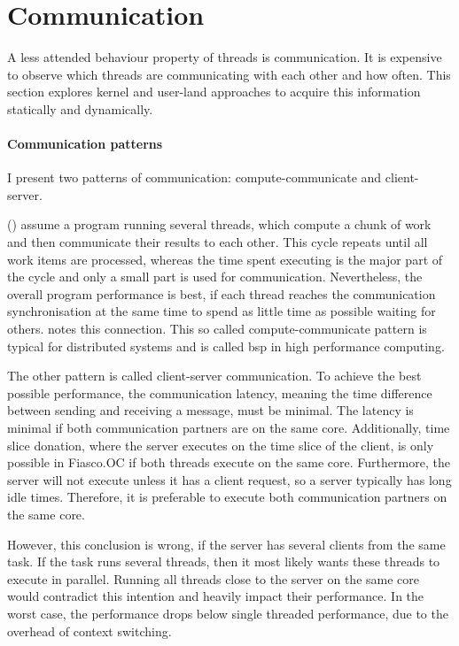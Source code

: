 \section{Communication}
\label{design:comm}


A less attended behaviour property of threads is communication.
It is expensive to observe which threads are communicating with each other and
how often.
This section explores kernel and user-land approaches to acquire this
information statically and dynamically.


\paragraph{Communication patterns}
I present two patterns of communication: compute-communicate and client-server.

\citeauthor{hofmeyr_load_2010} (\cite{hofmeyr_load_2010}) assume a program running several threads, which
compute a chunk of work and then communicate their results to each other.
This cycle repeats until all work items are processed, whereas the time spent executing
is the major part of the cycle and only a small part is used for communication.
Nevertheless, the overall program performance is best, if each thread reaches
the communication synchronisation at the same time to spend as little time as
possible waiting for others.
\cite{hofmeyr_load_2010} notes this connection.
This so called compute-communicate pattern is typical for distributed systems and is
called \gls{bsp} in high performance computing.

The other pattern is called client-server communication.
To achieve the best possible performance, the communication latency, meaning
the time difference between sending and receiving a message, must be minimal.
The latency is minimal if both communication partners are on the same core.
Additionally, time slice donation, where the server executes on the time slice
of the client, is only possible in Fiasco.OC if both threads execute on the same core.
Furthermore, the server will not execute unless it has a client request, so a
server typically has long idle times.
Therefore, it is preferable to execute both communication partners on the same
core.

However, this conclusion is wrong, if the server has several clients from the
same task.
If the task runs several threads, then it most likely wants these threads to
execute in parallel.
Running all threads close to the server on the same core would contradict this
intention and heavily impact their performance.
In the worst case, the performance drops below single threaded performance, due
to the overhead of context switching.

